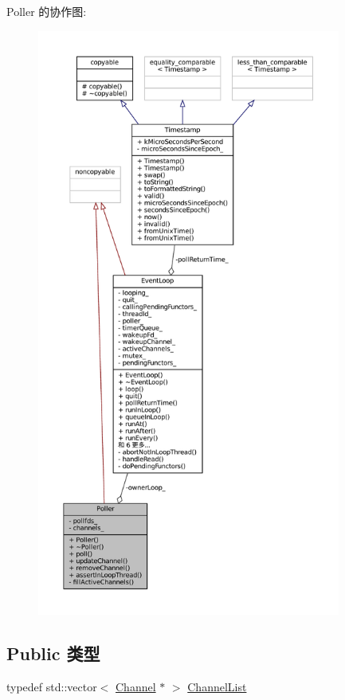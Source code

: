 Poller 的协作图\+:
\nopagebreak
\begin{figure}[H]
\begin{center}
\leavevmode
\includegraphics[height=550pt]{classmuduo_1_1Poller__coll__graph}
\end{center}
\end{figure}
\subsection*{Public 类型}
\begin{DoxyCompactItemize}
\item 
typedef std\+::vector$<$ \hyperlink{classmuduo_1_1Channel}{Channel} $\ast$ $>$ \hyperlink{classmuduo_1_1Poller_a0b74248ffee6df294563618187b52404}{Channel\+List}
\end{DoxyCompactItemize}
